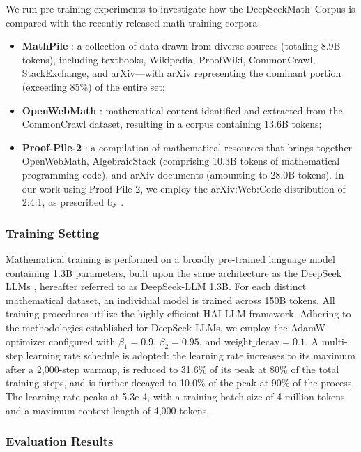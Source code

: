 \begin{itemize}[topsep=0pt]
We run pre-training experiments to investigate how the DeepSeekMath~Corpus is compared with the recently released math-training corpora:

\begin{itemize}[topsep=0pt]
    \item \textbf{MathPile} \citep{mathpile}: a collection of data drawn from diverse sources (totaling 8.9B tokens), including textbooks, Wikipedia, ProofWiki, CommonCrawl, StackExchange, and arXiv—with arXiv representing the dominant portion (exceeding 85\%) of the entire set;
    \item \textbf{OpenWebMath} \citep{openwebmath}: mathematical content identified and extracted from the CommonCrawl dataset, resulting in a corpus containing 13.6B tokens;
    \item \textbf{Proof-Pile-2} \citep{llemma}: a compilation of mathematical resources that brings together OpenWebMath, AlgebraicStack (comprising 10.3B tokens of mathematical programming code), and arXiv documents (amounting to 28.0B tokens). In our work using Proof-Pile-2, we employ the arXiv:Web:Code distribution of 2:4:1, as prescribed by \cite{llemma}.
\end{itemize}

\subsubsection{Training Setting}
\label{sec:quality-policy}
Mathematical training is performed on a broadly pre-trained language model containing 1.3B parameters, built upon the same architecture as the DeepSeek LLMs \citep{deepseek-llm}, hereafter referred to as DeepSeek-LLM 1.3B. For each distinct mathematical dataset, an individual model is trained across 150B tokens. All training procedures utilize the highly efficient HAI-LLM \citep{haillm} framework. Adhering to the methodologies established for DeepSeek LLMs, we employ the AdamW optimizer \citep{adamW} configured with $\beta_1=0.9$, $\beta_2=0.95$, and $\mathrm{weight\_decay}=0.1$. A multi-step learning rate schedule is adopted: the learning rate increases to its maximum after a 2,000-step warmup, is reduced to 31.6\% of its peak at 80\% of the total training steps, and is further decayed to 10.0\% of the peak at 90\% of the process. The learning rate peaks at 5.3e-4, with a training batch size of 4 million tokens and a maximum context length of 4,000 tokens.

\subsubsection{Evaluation Results}


\end{itemize}
